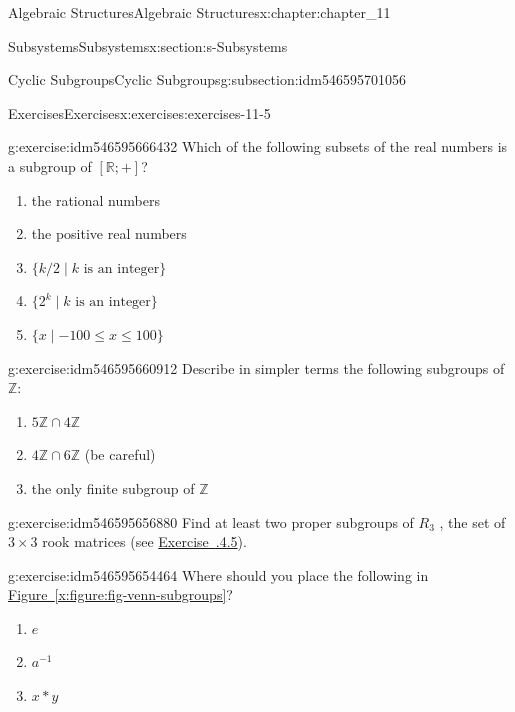 \documentclass[oneside,10pt,]{book}
\newcommand{\xreffont}{\relax}
\numberwithin{equation}{section}
\begin{document}
\begin{chapterptx}{Algebraic Structures}{}{Algebraic Structures}{}{}{x:chapter:chapter_11}
\begin{sectionptx}{Subsystems}{}{Subsystems}{}{}{x:section:s-Subsystems}
\begin{subsectionptx}{Cyclic Subgroups}{}{Cyclic Subgroups}{}{}{g:subsection:idm546595701056}
\end{subsectionptx}
%
%
\typeout{************************************************}
\typeout{************************************************}
%
\begin{exercises-subsection}{Exercises}{}{Exercises}{}{}{x:exercises:exercises-11-5}
\begin{divisionexercise}{1}{}{}{g:exercise:idm546595666432}%
Which of the following subsets of the real numbers is a subgroup of \([\mathbb{R}; +]\)?%
\begin{enumerate}[label=(\alph*)]
\item{}the rational numbers%
\item{}the positive real numbers%
\item{}\(\{k/2 \mid k \textrm{ is} \textrm{ an} \textrm{ integer}\}\)%
\item{}\(\{2^k  \mid k \textrm{ is an  integer}\}\)%
\item{}\(\{x \mid -100 \leq x \leq  100\}\)%
\end{enumerate}
%
\end{divisionexercise}%
\begin{divisionexercise}{2}{}{}{g:exercise:idm546595660912}%
Describe in simpler terms the following subgroups of \(\mathbb{Z}\):%
\begin{enumerate}[label=(\alph*)]
\item{}\(5\mathbb{Z} \cap  4\mathbb{Z}\)%
\item{}\(4\mathbb{Z} \cap  6\mathbb{Z}\) (be careful)%
\item{}the only finite subgroup of \(\mathbb{Z}\)%
\end{enumerate}
%
\end{divisionexercise}%
\begin{divisionexercise}{3}{}{}{g:exercise:idm546595656880}%
Find at least two proper subgroups of \(R_3\) , the set of \(3\times 3\) rook matrices (see \hyperlink{x:exercise:ex-rook-matrices}{Exercise~{\xreffont 11.2.4.5}}).%
\end{divisionexercise}%
\begin{divisionexercise}{4}{}{}{g:exercise:idm546595654464}%
Where should you place the following in \hyperref[x:figure:fig-venn-subgroups]{Figure~{\xreffont\ref{x:figure:fig-venn-subgroups}}}?%
\begin{enumerate}[label=(\alph*)]
\item{}\(e\)%
\item{}\(a^{-1}\)%
\item{}\(x * y\)%

\end{enumerate}
\end{divisionexercise}
\end{exercises-subsection}
\end{sectionptx}
\end{chapterptx}
\end{document}
